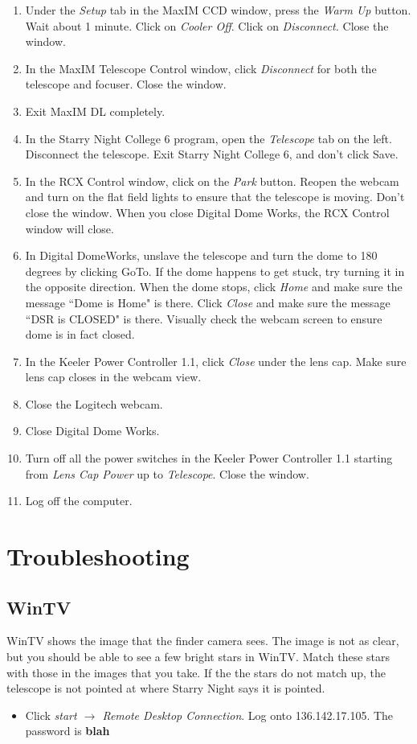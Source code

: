 \documentclass[11pt]{report}
\begin{document}
\begin{enumerate}
\item Under the \emph{Setup} tab in the MaxIM CCD window, press the \emph{Warm Up} button. Wait about 1 minute. Click on \emph{Cooler Off}. Click on \emph{Disconnect.} Close the window.
\item In the MaxIM Telescope Control window, click \emph{Disconnect} for both the telescope and focuser. Close the window.
\item Exit MaxIM DL completely.
\item In the Starry Night College 6 program, open the \emph{Telescope} tab on the left. Disconnect the telescope. Exit Starry Night College 6, and don't click Save.
\item In the RCX Control window, click on the \emph{Park} button. Reopen the webcam and turn on the flat field lights to ensure that the telescope is moving. Don't close the window. When you close Digital Dome Works, the RCX Control window will close.
\item In Digital DomeWorks, unslave the telescope and turn the dome to 180 degrees by clicking GoTo. If the dome happens to get stuck, try turning it in the opposite direction. When the dome stops, click \emph{Home} and make sure the message ``Dome is Home" is there. Click \emph{Close} and make sure the message ``DSR is CLOSED" is there. Visually check the webcam screen to ensure dome is in fact closed.
\item In the Keeler Power Controller 1.1, click \emph{Close} under the lens cap. Make sure lens cap closes in the webcam view.
\item Close the Logitech webcam.
\item Close Digital Dome Works.
\item Turn off all the power switches in the Keeler Power Controller 1.1 starting from \emph{Lens Cap Power} up to \emph{Telescope}. Close the window. 
\item Log off the computer.
\end{enumerate}

\chapter{Troubleshooting}

\section{WinTV}

WinTV shows the image that the finder camera sees. The image is not as clear, but you should be able to see a few bright stars in WinTV. Match these stars with those in the images that you take. If the the stars do not match up, the telescope is not pointed at where Starry Night says it is pointed.
\begin{itemize}
\item Click \emph{start {$\rightarrow$} Remote Desktop Connection}. Log onto 136.142.17.105. The password is {\bf blah}
\end{itemize}
\end{document}
